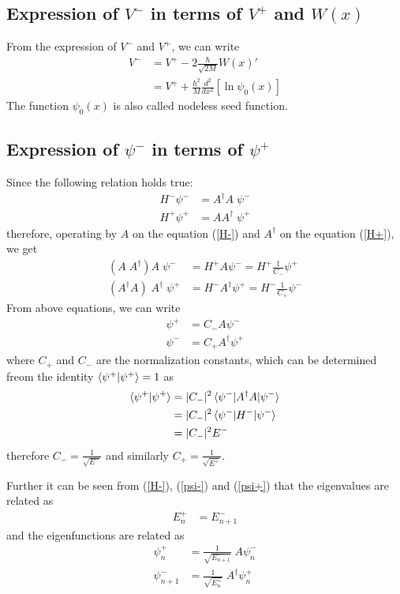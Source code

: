 \documentclass[a4paper, 12pt]{article}
\begin{document}
\subsection*{Expression of \(V^-\) in terms of \(V^+\) and \(W(x)\)}

From the expression of \(V^-\) and \(V^+\), we can write
\begin{align}
V^- &=V^+ - 2\frac{\hbar}{\sqrt{2M}}W(x)'\\
&=V^+ + \frac{\hbar^2}{M} \frac{d^2}{dx^2}\left[\ln\psi_0(x)\right]\label{partner-potential}
\end{align}
The function \( \psi_0(x) \) is also called nodeless seed function. 

\subsection*{Expression of \(\psi^-\) in terms of \(\psi^+\)}

Since the following relation holds true:
\begin{align}
    H^-\psi^-&=A^\dagger A\;\psi^-\label{H-}\\
    H^+\psi^+&=AA^\dagger \;\psi^+\label{H+}
\end{align}
therefore, operating by \( A \) on the equation (\ref{H-}) and \( A^\dagger \) on the equation (\ref{H+}), we get
\begin{align}
    \left(A\;A^\dagger\right) A\;\psi^-&=H^+A\psi^-=H^+\frac{1}{C_-}\psi^+\nonumber\\
    \left(A^\dagger A\right)\;A^\dagger\;\psi^+&=H^-A^\dagger\psi^+=H^-\frac{1}{C_+}\psi^-\nonumber
\end{align}
From above equations, we can write
\begin{align}
    \psi^+&=C_- A\psi^-\label{psi+}\\
    \psi^-&=C_+ A^\dagger\psi^+\label{psi-}
\end{align}
where \( C_+ \) and \( C_- \) are the normalization constants, which can be determined freom the identity $ \braket{\psi^+|\psi^+}=1$ as
\begin{align*}
    \braket{\psi^+|\psi^+}&=|C_-|^2\braket{\psi^-|A^\dagger A|\psi^-}\\&=|C_-|^2\braket{\psi^-|H^-|\psi^-}\\&=|C_-|^2E^-
\end{align*}
therefore \( C_-=\frac{1}{\sqrt{E^-}} \) and similarly \( C_+=\frac{1}{\sqrt{E^+}} \).

Further it can be seen from (\ref{H-}), (\ref{psi-}) and (\ref{psi+}) that the eigenvalues are related as
\begin{align}
    E^+_n&=E^-_{n+1}
\end{align}
and the eigenfunctions are related as
\begin{align}
    \psi^+_{n}&=\frac{1}{\sqrt{E^-_{n+1}}}\;A\psi^-_{n}\\
    \psi^-_{n+1}&=\frac{1}{\sqrt{E^+_n}}\;A^\dagger\psi^+_{n}
\end{align}
\end{document}
